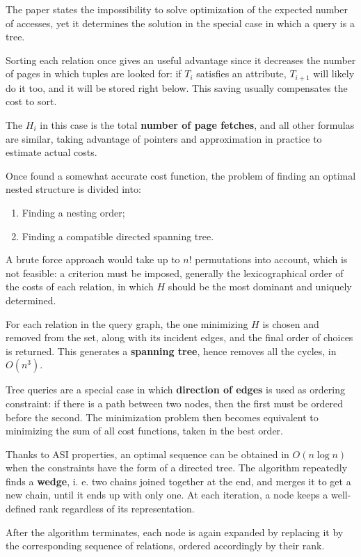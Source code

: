 The paper states the impossibility to solve optimization of the expected number of accesses, yet it determines the solution in the special case in which a query is a tree. 

Sorting each relation once gives an useful advantage since it decreases the number of pages in which tuples are looked for: if $T_i$ satisfies an attribute, $T_{i+1}$ will likely do it too, and it will be stored right below. This saving usually compensates the cost to sort.

The $H_i$ in this case is the total \textbf{number of page fetches}, and all other formulas are similar, taking advantage of pointers and approximation in practice to estimate actual costs.

Once found a somewhat accurate cost function, the problem of finding an optimal nested structure is divided into:
\begin{enumerate}
	\item Finding a nesting order;
	\item Finding a compatible directed spanning tree.
\end{enumerate}

A brute force approach would take up to $n!$ permutations into account, which is not feasible: a criterion must be imposed, generally the lexicographical order of the costs of each relation, in which $H$ should be the most dominant and uniquely determined.

For each relation in the query graph, the one minimizing $H$ is chosen and removed from the set, along with its incident edges, and the final order of choices is returned. This generates a \textbf{spanning tree}, hence removes all the cycles, in $O(n^3)$. 

Tree queries are a special case in which \textbf{direction of edges} is used as ordering constraint: if there is a path between two nodes, then the first must be ordered before the second. The minimization problem then becomes equivalent to minimizing the sum of all cost functions, taken in the best order.

Thanks to ASI properties, an optimal sequence can be obtained in $O(n\log n)$ when the constraints have the form of a directed tree. The algorithm repeatedly finds a \textbf{wedge}, i. e. two chains joined together at the end, and merges it to get a new chain, until it ends up with only one. At each iteration, a node keeps a well-defined rank regardless of its representation.

After the algorithm terminates, each node is again expanded by replacing it by the corresponding sequence of relations, ordered accordingly by their rank. 

